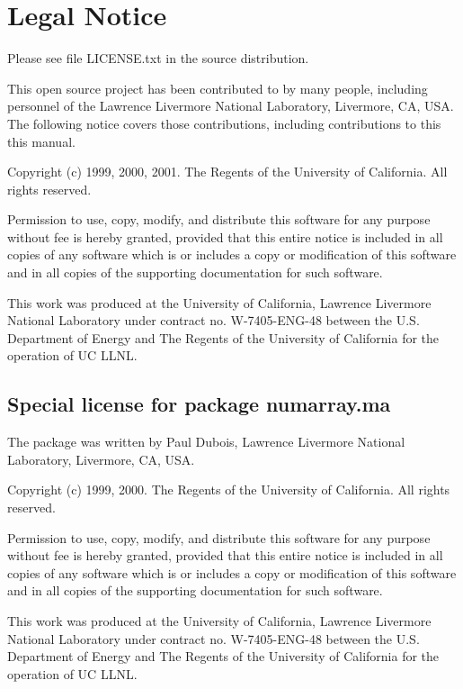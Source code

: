 \section*{Legal Notice}
\label{sec:legal-notice}

Please see file LICENSE.txt in the source distribution.  

This open source project has been contributed to by many people, including
personnel of the Lawrence Livermore National Laboratory, Livermore, CA, USA.
The following notice covers those contributions, including contributions to
this this manual.

Copyright (c) 1999, 2000, 2001.  The Regents of the University of California.
All rights reserved.

Permission to use, copy, modify, and distribute this software for any purpose
without fee is hereby granted, provided that this entire notice is included in
all copies of any software which is or includes a copy or modification of this
software and in all copies of the supporting documentation for such software.

This work was produced at the University of California, Lawrence Livermore
National Laboratory under contract no. W-7405-ENG-48 between the U.S.
Department of Energy and The Regents of the University of California for the
operation of UC LLNL.



\subsection*{Special license for package numarray.ma}
\label{sec:license-numarray.ma}


The package  was written by Paul Dubois, Lawrence Livermore
National Laboratory, Livermore, CA, USA.

Copyright (c) 1999, 2000. The Regents of the University of California. All
rights reserved.

Permission to use, copy, modify, and distribute this software for any purpose
without fee is hereby granted, provided that this entire notice is included in
all copies of any software which is or includes a copy or modification of this
software and in all copies of the supporting documentation for such software.

This work was produced at the University of California, Lawrence Livermore
National Laboratory under contract no. W-7405-ENG-48 between the U.S.
Department of Energy and The Regents of the University of California for the
operation of UC LLNL.



